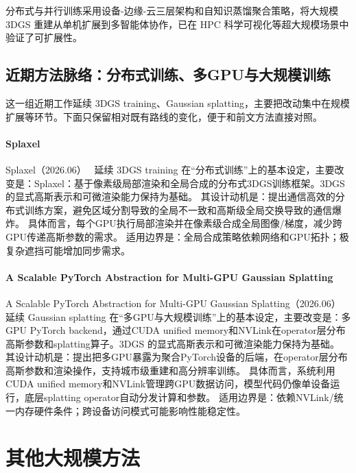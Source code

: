 \begin{takeaway}
分布式与并行训练采用设备-边缘-云三层架构和自知识蒸馏聚合策略，将大规模 3DGS 重建从单机扩展到多智能体协作，已在 HPC 科学可视化等超大规模场景中验证了可扩展性。
\end{takeaway}


\subsection{近期方法脉络：分布式训练、多GPU与大规模训练}

这一组近期工作延续 3DGS training、Gaussian splatting，主要把改动集中在规模扩展等环节。下面只保留相对既有路线的变化，便于和前文方法直接对照。

\paragraph{Splaxel}
Splaxel（2026.06）~\cite{2606_18588} 延续 3DGS training 在“分布式训练”上的基本设定，主要改变是：Splaxel：基于像素级局部渲染和全局合成的分布式3DGS训练框架。3DGS 的显式高斯表示和可微渲染能力保持为基础。
其设计动机是：提出通信高效的分布式训练方案，避免区域分割导致的全局不一致和高斯级全局交换导致的通信爆炸。
具体而言，每个GPU执行局部渲染并在像素级合成全局图像/梯度，减少跨GPU传递高斯参数的需求。
适用边界是：全局合成策略依赖网络和GPU拓扑；极复杂遮挡可能增加同步需求。

\paragraph{A Scalable PyTorch Abstraction for Multi-GPU Gaussian Splatting}
A Scalable PyTorch Abstraction for Multi-GPU Gaussian Splatting（2026.06）~\cite{2606_11390} 延续 Gaussian splatting 在“多GPU与大规模训练”上的基本设定，主要改变是：多GPU PyTorch backend，通过CUDA unified memory和NVLink在operator层分布高斯参数和splatting算子。3DGS 的显式高斯表示和可微渲染能力保持为基础。
其设计动机是：提出把多GPU暴露为聚合PyTorch设备的后端，在operator层分布高斯参数和渲染操作，支持城市级重建和高分辨率训练。
具体而言，系统利用CUDA unified memory和NVLink管理跨GPU数据访问，模型代码仍像单设备运行，底层splatting operator自动分发计算和参数。
适用边界是：依赖NVLink/统一内存硬件条件；跨设备访问模式可能影响性能稳定性。
\section{其他大规模方法}
\label{sec:14_5}

